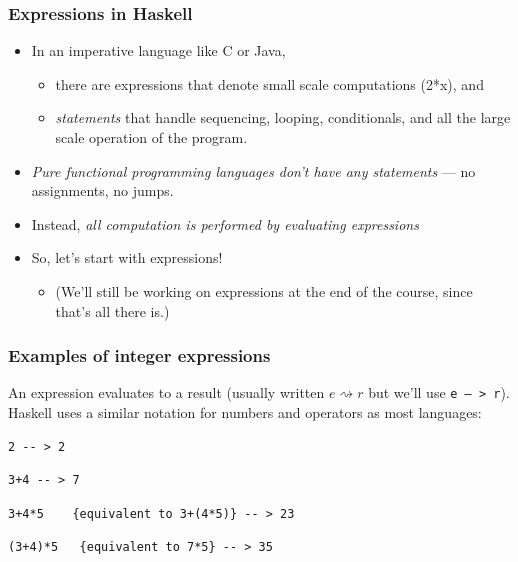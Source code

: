 \documentclass{beamer}
\begin{document}
\begin{frame}
\frametitle{Expressions in Haskell}

\begin{itemize}
\item In an imperative language like C or Java,
  \begin{itemize}
  \item there are expressions that denote small scale computations
    (2*x), and
  \item  \emph{statements} that handle sequencing, looping,
    conditionals, and all the large scale operation of the program.
  \end{itemize}
\item \emph{Pure functional programming languages don't have any statements} --- no
  assignments, no jumps.
\item Instead, \emph{all computation is performed by evaluating
    expressions}
\item So, let's start with expressions!
  \begin{itemize}
  \item (We'll still be working on expressions at the end of the
    course, since that's all there is.)
  \end{itemize}
\end{itemize}

\end{frame}

\begin{frame}[fragile]
\frametitle{Examples of integer expressions}

An expression evaluates to a result (usually written $e \rightsquigarrow r$ but we'll use \texttt{e -- > r}).  Haskell uses a similar notation for numbers and operators as most languages:

\begin{verbatim}
2 -- > 2
\end{verbatim}

\begin{verbatim}
3+4 -- > 7
\end{verbatim}

\begin{verbatim}
3+4*5    {equivalent to 3+(4*5)} -- > 23
\end{verbatim}

\begin{verbatim}
(3+4)*5   {equivalent to 7*5} -- > 35    
\end{verbatim}

\end{frame}
\end{document}
